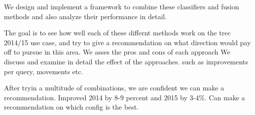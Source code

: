 We design and implement a framework to combine these classifiers and fusion methods and also analyze their performance in detail.

The goal is to see how well each of these differnt methods work on the trec 2014/15 use case, and try to
give a recommendation on what direction would pay off to pursue in this area.
We asses the pros and cons of each approach
We discuss and examine in detail the effect of the approaches. such as improvements per query, movements etc.

After tryin a multitude of combinations, we are confident we can make a recommendation.
Improved 2014 by 8-9 percent and 2015 by 3-4\%. Can make a recommendation on which config is the best.






